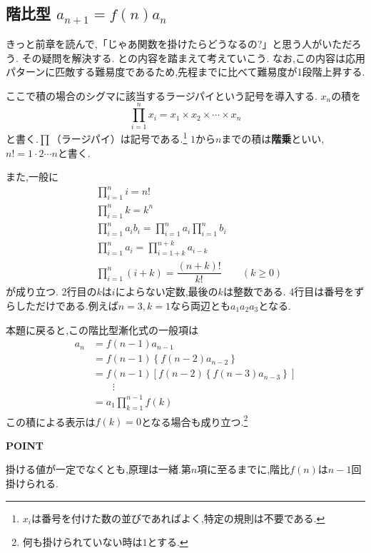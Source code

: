 
\subsection{\texorpdfstring{階比型  $a_{n+1}=f(n)a_n$}{階比型}}\label{節：階比型}
きっと前章を読んで,「じゃあ関数を掛けたらどうなるの?」と思う人がいただろう.
その疑問を解決する.
との内容を踏まえて考えていこう.
なお,この内容は応用パターンに匹敵する難易度であるため,先程までに比べて難易度が1段階上昇する.

ここで積の場合のシグマに該当するラージパイという記号を導入する.
$x_n$の積を
\[
  \prod_{i=1}^n x_i
  =x_1\times x_2\times\cdots\times x_n
\]
と書く.$\prod$（ラージパイ）は記号である.\footnote{$x_i$は番号を付けた数の並びであればよく,特定の規則は不要である.}
$1$から$n$までの積は\textbf{階乗}といい,$n!=1\cdot2\cdots n$と書く.

また,一般に
\begin{align*}
  &\prod_{i=1}^{n}i=n!\\
  &\prod_{i=1}^{n}k=k^n\\
  &\prod_{i=1}^{n}a_ib_i=\displaystyle\prod_{i=1}^na_i\displaystyle\prod_{i=1}^nb_i\\
  &\prod_{i=1}^{n}a_i=\displaystyle\prod_{i=1+k}^{n+k}a_{i-k}\\
  &\prod_{i=1}^{n}(i+k)=\dfrac{(n+k)!}{k!}\qquad(k\ge0)
\end{align*}
が成り立つ.
2行目の$k$は$i$によらない定数,最後の$k$は整数である.
4行目は番号をずらしただけである.例えば$n=3,k=1$なら両辺とも$a_1a_2a_3$となる.

本題に戻ると,この階比型漸化式の一般項は
\begin{align*}
  a_n&=f(n-1)a_{n-1}\\
  &=f(n-1)\left\{f(n-2)a_{n-2}\right\}\\
  &=f(n-1) \left[ f(n-2)\left\{f(n-3)a_{n-3}\right\} \right] \\
  &\qquad \vdots\\
  &=a_1\prod_{k=1}^{n-1} f(k)
\end{align*}
この積による表示は$f(k)=0$となる場合も成り立つ.\footnote{何も掛けられていない時は$1$とする.}
\begin{bookpoint}
  \textbf{POINT}\par
  掛ける値が一定でなくとも,原理は一緒.第$n$項に至るまでに,階比$f(n)$は$n-1$回掛けられる.
\end{bookpoint}

